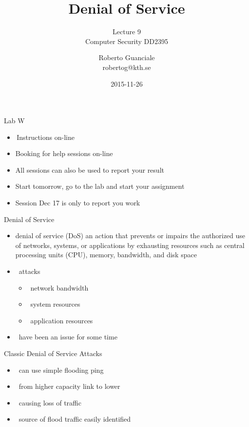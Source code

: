 \documentclass{beamer}
\title{Denial of Service}
\subtitle{Lecture 9 \\ Computer Security DD2395}
\author[R. Guanciale]{
  Roberto Guanciale\\
  robertog@kth.se
}
\date{2015-11-26}
\begin{document}
\begin{frame}[plain]
  \titlepage
\end{frame}

\begin{frame}{Lab W}
  \begin{itemize}
  \item Instructions on-line
  \item Booking for help sessions on-line
  \item All sessions can also be used to report your result
  \item Start tomorrow, go to the lab and start your assignment
  \item Session Dec 17 is only to report you work
  \end{itemize}
\end{frame}

\begin{frame}{Denial of Service}
  \begin{itemize}
  \item denial of service (DoS) an action that prevents or 
    impairs the authorized use of networks, systems, or 
    applications by exhausting resources such as central 
    processing units (CPU), memory, bandwidth, and 
    disk space 
  \item  attacks 
  \begin{itemize}
    \item  network bandwidth 
    \item  system resources 
    \item  application resources 
  \end{itemize}
  \item  have been an issue for some time
  \end{itemize}
\end{frame}

\begin{frame}{Classic Denial of Service Attacks}
  \begin{itemize}
  \item  can use simple flooding ping 
  \item  from higher capacity link to lower 
  \item  causing loss of traffic 
  \item  source of flood traffic easily identified
  \end{itemize}
\end{frame}
\end{document}
